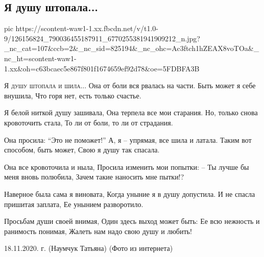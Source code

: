  
 
 

\subsection{Я душу штопала...}

\ifcmt
pic https://scontent-waw1-1.xx.fbcdn.net/v/t1.0-9/126156824_790036455187911_6770255381941909212_n.jpg?_nc_cat=107&ccb=2&_nc_sid=825194&_nc_ohc=Ac3ftch1hZEAX8voTOa&_nc_ht=scontent-waw1-1.xx&oh=c63bcaec5e867f801f1674659ef92d78&oe=5FDBFA3B
\fi

\begin{multicols}{2}

\obeycr
\lettrine[lines=4]{Я}{ душу штопала и шила...}
Она от боли вся рвалась на части.
Быть может я себе внушила,
Что горя нет, есть только счастье.

Я белой ниткой душу зашивала,
Она терпела все мои старания.
Но, только снова кровоточить стала,
То ли от боли, то ли от страдания.

Она просила: \enquote{Это не поможет!}
А, я -- упрямая, все шила и латала.
Таким вот способом, быть может,
Свою я душу  так спасала.

Она все кровоточила и ныла,
Просила изменить мои попытки:
-- Ты лучше бы меня вновь полюбила,
Зачем такие наносить мне пытки!?

Наверное была сама я виновата,
Когда уныние я в душу допустила.
И не спасла пришитая заплата,
Ее унынием разворотило.

Просьбам души своей внимая,
Один здесь выход может быть:
Ее всю нежность и ранимость понимая,
Жалеть нам надо свою душу и любить!

18.11.2020. г. (Наумчук Татьяна) 
(Фото из интернета)
\restorecr
\end{multicols}
